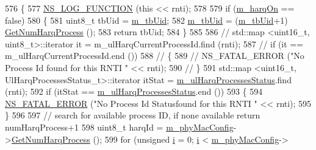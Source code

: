 \begin{DoxyCode}
576 \{
577         \hyperlink{log-macros-disabled_8h_a90b90d5bad1f39cb1b64923ea94c0761}{NS\_LOG\_FUNCTION} (\textcolor{keyword}{this} << rnti);
578 
579         \textcolor{keywordflow}{if} (\hyperlink{classns3_1_1MmWaveFlexTtiMacScheduler_a832729b006315bb770e9f50c16305118}{m\_harqOn} == \textcolor{keyword}{false})
580         \{
581                 uint8\_t tbUid = \hyperlink{classns3_1_1MmWaveFlexTtiMacScheduler_a6164b3a4d99c83b291b54104a29ecaad}{m\_tbUid};
582                 \hyperlink{classns3_1_1MmWaveFlexTtiMacScheduler_a6164b3a4d99c83b291b54104a29ecaad}{m\_tbUid} = (\hyperlink{classns3_1_1MmWaveFlexTtiMacScheduler_a6164b3a4d99c83b291b54104a29ecaad}{m\_tbUid}+1) %
      \hyperlink{classns3_1_1MmWavePhyMacCommon_a40773d84172ebeb5aff125f56ebcc5ac}{GetNumHarqProcess} ();
583                 \textcolor{keywordflow}{return} tbUid;
584         \}
585 
586 \textcolor{comment}{//      std::map <uint16\_t, uint8\_t>::iterator it = m\_ulHarqCurrentProcessId.find (rnti);}
587 \textcolor{comment}{//      if (it == m\_ulHarqCurrentProcessId.end ())}
588 \textcolor{comment}{//      \{}
589 \textcolor{comment}{//              NS\_FATAL\_ERROR ("No Process Id found for this RNTI " << rnti);}
590 \textcolor{comment}{//      \}}
591         std::map <uint16\_t, UlHarqProcessesStatus\_t>::iterator itStat = 
      \hyperlink{classns3_1_1MmWaveFlexTtiMacScheduler_af728e6ddeaaf55536ca842682904d64a}{m\_ulHarqProcessesStatus}.find (rnti);
592         \textcolor{keywordflow}{if} (itStat == \hyperlink{classns3_1_1MmWaveFlexTtiMacScheduler_af728e6ddeaaf55536ca842682904d64a}{m\_ulHarqProcessesStatus}.end ())
593         \{
594                 \hyperlink{group__fatal_ga5131d5e3f75d7d4cbfd706ac456fdc85}{NS\_FATAL\_ERROR} (\textcolor{stringliteral}{"No Process Id Statusfound for this RNTI "} << rnti);
595         \}
596 
597         \textcolor{comment}{// search for available process ID, if none available return numHarqProcess+1}
598         uint8\_t harqId = \hyperlink{classns3_1_1MmWaveMacScheduler_a24d7af4971d2e500fe543cefbafa2fd9}{m\_phyMacConfig}->\hyperlink{classns3_1_1MmWavePhyMacCommon_a40773d84172ebeb5aff125f56ebcc5ac}{GetNumHarqProcess} ();
599         \textcolor{keywordflow}{for} (\textcolor{keywordtype}{unsigned} \hyperlink{bernuolliDistribution_8m_a6f6ccfcf58b31cb6412107d9d5281426}{i} = 0; \hyperlink{bernuolliDistribution_8m_a6f6ccfcf58b31cb6412107d9d5281426}{i} < \hyperlink{classns3_1_1MmWaveMacScheduler_a24d7af4971d2e500fe543cefbafa2fd9}{m\_phyMacConfig}->

\end{DoxyCode}
